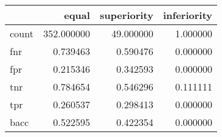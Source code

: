 \begin{tabular}{lrrr}
\toprule
{} &       equal &  superiority &  inferiority \\
\midrule
count &  352.000000 &    49.000000 &     1.000000 \\
fnr   &    0.739463 &     0.590476 &     0.000000 \\
fpr   &    0.215346 &     0.342593 &     0.000000 \\
tnr   &    0.784654 &     0.546296 &     0.111111 \\
tpr   &    0.260537 &     0.298413 &     0.000000 \\
bacc  &    0.522595 &     0.422354 &     0.000000 \\
\bottomrule
\end{tabular}
